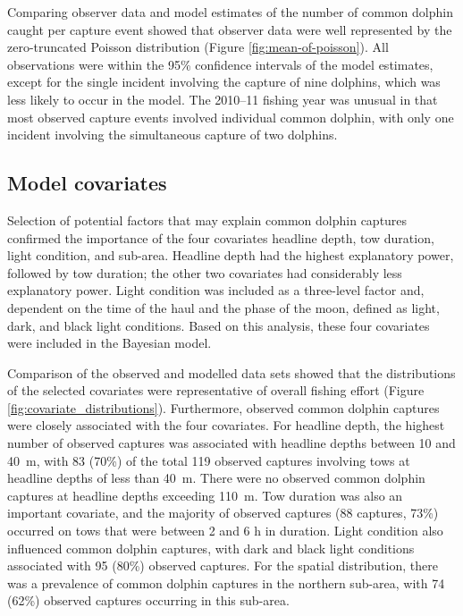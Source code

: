 \documentclass[10pt]{article}
\begin{document}
Comparing observer data and model estimates of the number of common dolphin caught per capture event showed that observer data were well represented by the zero-truncated Poisson distribution (Figure \ref{fig:mean-of-poisson}). All observations were within the 95\% confidence intervals of the model estimates, except for the single incident involving the capture of nine dolphins, which was less likely to occur in the model.  The \mbox{2010--11} fishing year was unusual in that most observed capture events involved individual common dolphin, with only one incident involving the simultaneous capture of two dolphins.  


\subsection*{Model covariates}

Selection of potential factors that may explain common dolphin
captures confirmed the importance of the four covariates headline
depth, tow duration,
light condition, and sub-area. 
Headline depth had the highest explanatory power, followed by tow duration; the other two covariates had considerably less explanatory power. Light condition was included as a three-level factor and, dependent on the time of the haul and the phase of the moon, defined as light, dark, and black light conditions. 
Based on this analysis, these four covariates were included in the Bayesian model. 

Comparison of the observed and modelled data sets showed that the
distributions of the selected covariates were representative of
overall fishing effort (Figure \ref{fig:covariate_distributions}).
Furthermore, observed common dolphin captures were closely associated
with the four covariates.  For headline depth, the highest number of
observed captures was associated with headline depths between 10 and
40~m, with 83 (70\%) of the total 119 observed captures involving tows
at headline depths of less than 40~m.  There were no observed common
dolphin captures at headline depths exceeding 110~m.  Tow duration was also an
important covariate, and the majority of observed captures (88
captures, 73\%) occurred on tows that were between 2 and 6 h in duration. Light condition  also influenced common dolphin captures, with dark and black light conditions associated with 95 (80\%) observed captures.  For the spatial distribution, there was a prevalence of common dolphin captures in the northern sub-area, with 74 (62\%) observed captures occurring in this sub-area.
\end{document}
